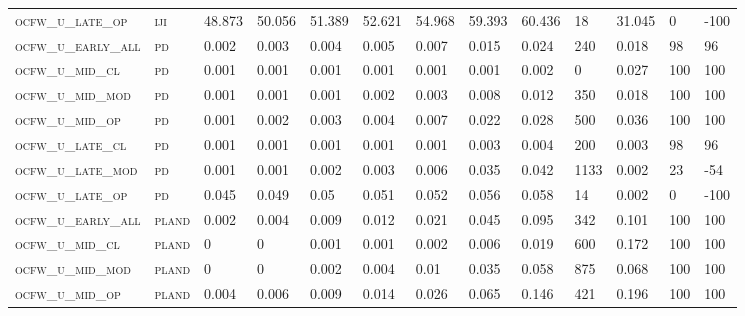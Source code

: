 \begin{landscape}
\begin{center}
\begin{footnotesize}
\begin{longtable}{lllllllllllll}
\textsc{ocfw\_u\_late\_op  } & \textsc{iji       }   & 48.873   & 50.056   & 51.389   & 52.621   & 54.968   & 59.393   & 60.436    & 18     & 31.045        & 0             & -100     \\
\textsc{ocfw\_u\_early\_all} & \textsc{pd        }   & 0.002    & 0.003    & 0.004    & 0.005    & 0.007    & 0.015    & 0.024     & 240    & 0.018         & 98            & 96       \\
\textsc{ocfw\_u\_mid\_cl   } & \textsc{pd        }   & 0.001    & 0.001    & 0.001    & 0.001    & 0.001    & 0.001    & 0.002     & 0      & 0.027         & 100           & 100      \\
\textsc{ocfw\_u\_mid\_mod  } & \textsc{pd        }   & 0.001    & 0.001    & 0.001    & 0.002    & 0.003    & 0.008    & 0.012     & 350    & 0.018         & 100           & 100      \\
\textsc{ocfw\_u\_mid\_op   } & \textsc{pd        }   & 0.001    & 0.002    & 0.003    & 0.004    & 0.007    & 0.022    & 0.028     & 500    & 0.036         & 100           & 100      \\
\textsc{ocfw\_u\_late\_cl  } & \textsc{pd        }   & 0.001    & 0.001    & 0.001    & 0.001    & 0.001    & 0.003    & 0.004     & 200    & 0.003         & 98            & 96       \\
\textsc{ocfw\_u\_late\_mod } & \textsc{pd        }   & 0.001    & 0.001    & 0.002    & 0.003    & 0.006    & 0.035    & 0.042     & 1133   & 0.002         & 23            & -54      \\
\textsc{ocfw\_u\_late\_op  } & \textsc{pd        }   & 0.045    & 0.049    & 0.05     & 0.051    & 0.052    & 0.056    & 0.058     & 14     & 0.002         & 0             & -100     \\
\textsc{ocfw\_u\_early\_all} & \textsc{pland     }   & 0.002    & 0.004    & 0.009    & 0.012    & 0.021    & 0.045    & 0.095     & 342    & 0.101         & 100           & 100      \\
\textsc{ocfw\_u\_mid\_cl   } & \textsc{pland     }   & 0        & 0        & 0.001    & 0.001    & 0.002    & 0.006    & 0.019     & 600    & 0.172         & 100           & 100      \\
\textsc{ocfw\_u\_mid\_mod  } & \textsc{pland     }   & 0        & 0        & 0.002    & 0.004    & 0.01     & 0.035    & 0.058     & 875    & 0.068         & 100           & 100      \\
\textsc{ocfw\_u\_mid\_op   } & \textsc{pland     }   & 0.004    & 0.006    & 0.009    & 0.014    & 0.026    & 0.065    & 0.146     & 421    & 0.196         & 100           & 100      \\

\end{longtable}
\end{footnotesize}
\end{center}
\end{landscape}

